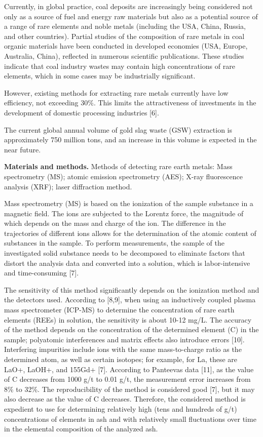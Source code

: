Currently, in global practice, coal deposits are increasingly being
considered not only as a source of fuel and energy raw materials but
also as a potential source of a range of rare elements and noble metals
(including the USA, China, Russia, and other countries). Partial studies
of the composition of rare metals in coal organic materials have been
conducted in developed economies (USA, Europe, Australia, China),
reflected in numerous scientific publications. These studies indicate
that coal industry wastes may contain high concentrations of rare
elements, which in some cases may be industrially significant.

However, existing methods for extracting rare metals currently have low
efficiency, not exceeding 30\%. This limits the attractiveness of
investments in the development of domestic processing industries
{[}6{]}.

The current global annual volume of gold slag waste (GSW) extraction is
approximately 750 million tons, and an increase in this volume is
expected in the near future.

\textbf{Materials and methods.} Methods of detecting rare earth metals:
Mass spectrometry (MS); atomic emission spectrometry (AES); X-ray
fluorescence analysis (XRF); laser diffraction method.

Mass spectrometry (MS) is based on the ionization of the sample
substance in a magnetic field. The ions are subjected to the Lorentz
force, the magnitude of which depends on the mass and charge of the ion.
The difference in the trajectories of different ions allows for the
determination of the atomic content of substances in the sample. To
perform measurements, the sample of the investigated solid substance
needs to be decomposed to eliminate factors that distort the analysis
data and converted into a solution, which is labor-intensive and
time-consuming {[}7{]}.

The sensitivity of this method significantly depends on the ionization
method and the detectors used. According to {[}8,9{]}, when using an
inductively coupled plasma mass spectrometer (ICP-MS) to determine the
concentration of rare earth elements (REEs) in solution, the sensitivity
is about 10-12 mg/L. The accuracy of the method depends on the
concentration of the determined element (C) in the sample; polyatomic
interferences and matrix effects also introduce errors {[}10{]}.
Interfering impurities include ions with the same mass-to-charge ratio
as the determined atom, as well as certain isotopes; for example, for
La, these are LaO+, LaOH+, and 155Gd+ {[}7{]}. According to
Panteeva\textquotesingle s data {[}11{]}, as the value of C decreases
from 1000 g/t to 0.01 g/t, the measurement error increases from 8\% to
32\%. The reproducibility of the method is considered good {[}7{]}, but
it may also decrease as the value of C decreases. Therefore, the
considered method is expedient to use for determining relatively high
(tens and hundreds of g/t) concentrations of elements in ash and with
relatively small fluctuations over time in the elemental composition of
the analyzed ash.


